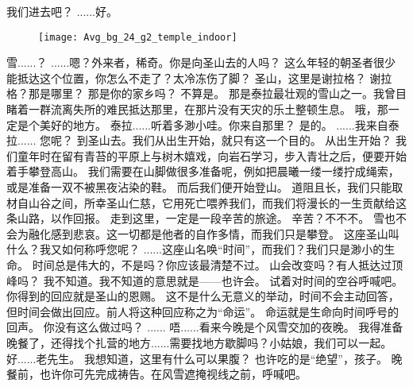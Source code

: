 \documentclass[openany]{book}
\begin{document}
\begin{dialogue}
     我们进去吧？
     ......好。
    \begin{figure}[h]
        \centering
        \texttt{[image: Avg\_bg\_24\_g2\_temple\_indoor]}
    \end{figure}
     雪......？
     ......嗯？外来者，稀奇。你是向圣山去的人吗？
     这么年轻的朝圣者很少能抵达这个位置，你怎么不走了？太冷冻伤了脚？
     圣山，这里是谢拉格？
     谢拉格？那是哪里？
     那是你的家乡吗？
     不算是。
     那是泰拉最壮观的雪山之一。我曾目睹着一群流离失所的难民抵达那里，在那片没有天灾的乐土整顿生息。
     哦，那一定是个美好的地方。
     泰拉......听着多渺小哇。你来自那里？
     是的。
     ......我来自泰拉......
     您呢？
     到圣山去。我们从出生开始，就只有这一个目的。
     从出生开始？
     我们童年时在留有青苔的平原上与树木嬉戏，向岩石学习，步入青壮之后，便要开始着手攀登高山。
     我们需要在山脚做很多准备呢，例如把晨曦一缕一缕拧成绳索，或是准备一双不被黑夜沾染的鞋。
     而后我们便开始登山。
     道阻且长，我们只能取材自山谷之间，所幸圣山仁慈，它用死亡喂养我们，而我们将漫长的一生贡献给这条山路，以作回报。
     走到这里，一定是一段辛苦的旅途。
     辛苦？不不不。
     雪也不会为融化感到悲哀。这一切都是他者的自作多情，而我们只是攀登。
     这座圣山叫什么？我又如何称呼您呢？
     ......这座山名唤“时间”，而我们？我们只是渺小的生命。
     时间总是伟大的，不是吗？你应该最清楚不过。
     山会改变吗？有人抵达过顶峰吗？
     我不知道。我不知道的意思就是——也许会。
     试着对时间的空谷呼喊吧。你得到的回应就是圣山的恩赐。
     这不是什么无意义的举动，时间不会主动回答，但时间会做出回应。前人将这种回应称之为“命运”。
     命运就是生命向时间呼号的回声。
     你没有这么做过吗？
     ......
     唔......看来今晚是个风雪交加的夜晚。
     我得准备晚餐了，还得找个扎营的地方......需要找地方歇脚吗？小姑娘，我们可以一起。
     好......老先生。
     我想知道，这里有什么可以果腹？
     也许吃的是“绝望”，孩子。
     晚餐前，也许你可先完成祷告。在风雪遮掩视线之前，呼喊吧。

\end{dialogue}
\end{document}
